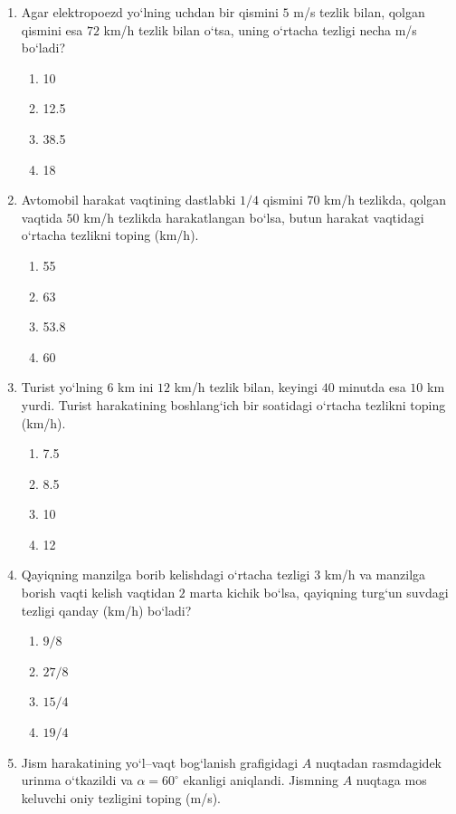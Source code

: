 \begin{enumerate}
\item Agar elektropoezd yo‘lning uchdan bir qismini
$5$ m/s tezlik bilan, qolgan qismini esa
$72$ km/h tezlik bilan o‘tsa, uning o‘rtacha tezligi
necha m/s bo‘ladi?

\begin{enumerate}[label=\Alph*)]
\item 10
\item 12.5
\item 38.5
\item 18
\end{enumerate}


\item Avtomobil harakat vaqtining dastlabki $1/4$ qismini
$70$ km/h tezlikda, qolgan vaqtida $50$ km/h tezlikda
harakatlangan bo‘lsa, butun harakat vaqtidagi
o‘rtacha tezlikni toping (km/h).

\begin{enumerate}[label=\Alph*)]
\item 55
\item 63
\item 53.8
\item 60
\end{enumerate}


\item Turist yo‘lning $6$ km ini $12$ km/h tezlik bilan,
keyingi $40$ minutda esa $10$ km yurdi.
Turist harakatining boshlang‘ich bir soatidagi
o‘rtacha tezlikni toping (km/h).

\begin{enumerate}[label=\Alph*)]
\item 7.5
\item 8.5
\item 10
\item 12
\end{enumerate}


\item Qayiqning manzilga borib kelishdagi o‘rtacha tezligi
$3$ km/h va manzilga borish vaqti kelish vaqtidan
$2$ marta kichik bo‘lsa, qayiqning turg‘un suvdagi
tezligi qanday (km/h) bo‘ladi?

\begin{enumerate}[label=\Alph*)]
\item $9/8$
\item $27/8$
\item $15/4$
\item $19/4$

\end{enumerate}


\item Jism harakatining yo‘l–vaqt bog‘lanish grafigidagi $A$ nuqtadan rasmdagidek urinma o‘tkazildi va $\alpha = 60^\circ$ ekanligi aniqlandi.
Jismning $A$ nuqtaga mos keluvchi oniy tezligini toping (m/s).



\end{enumerate}
